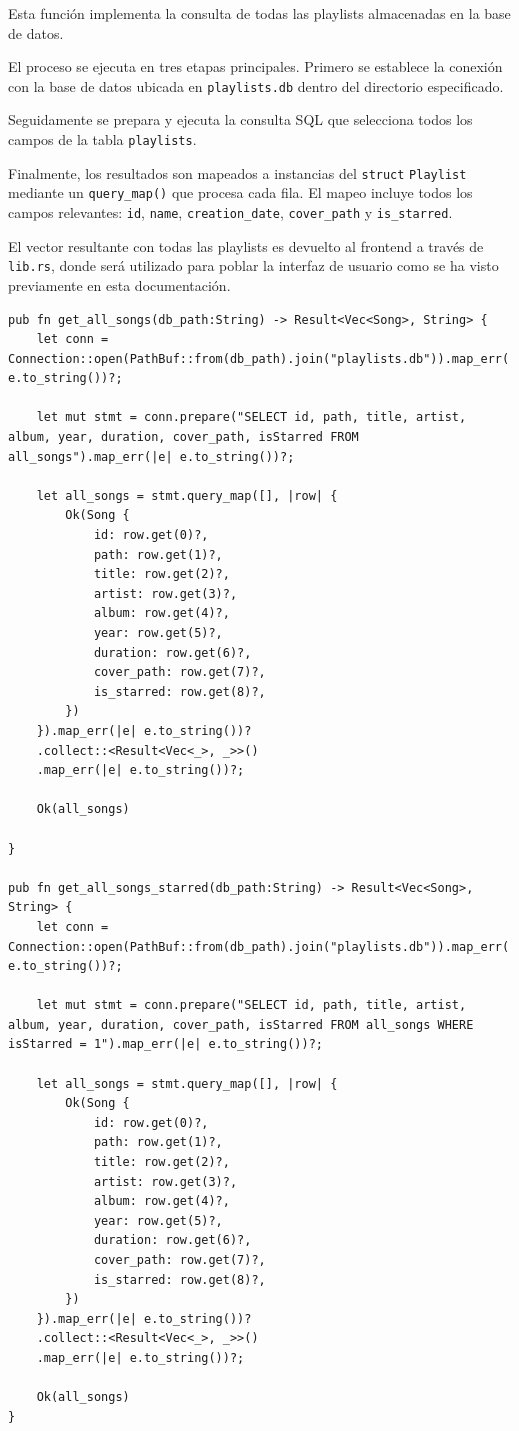 \documentclass[11pt, a4paper]{article}
\begin{document}
            Esta función implementa la consulta de todas las playlists almacenadas en la base de datos.

            El proceso se ejecuta en tres etapas principales. Primero se establece la conexión con la base de datos ubicada en \verb|playlists.db| dentro del directorio especificado.

            Seguidamente se prepara y ejecuta la consulta SQL que selecciona todos los campos de la tabla \verb|playlists|.

            Finalmente, los resultados son mapeados a instancias del \verb|struct| \verb|Playlist| mediante un \verb|query_map()| que procesa cada fila. El mapeo incluye todos los campos relevantes: \verb|id|, \verb|name|, \verb|creation_date|, \verb|cover_path| y \verb|is_starred|.

            El vector resultante con todas las playlists es devuelto al frontend a través de \verb|lib.rs|, donde será utilizado para poblar la interfaz de usuario como se ha visto previamente en esta documentación.

            \begin{lstlisting}[caption={fn get\_all\_songs() y fn get\_all\_songs\_starred()}]
pub fn get_all_songs(db_path:String) -> Result<Vec<Song>, String> {
    let conn = Connection::open(PathBuf::from(db_path).join("playlists.db")).map_err(|e| e.to_string())?;

    let mut stmt = conn.prepare("SELECT id, path, title, artist, album, year, duration, cover_path, isStarred FROM all_songs").map_err(|e| e.to_string())?;

    let all_songs = stmt.query_map([], |row| {
        Ok(Song {
            id: row.get(0)?,
            path: row.get(1)?,
            title: row.get(2)?,
            artist: row.get(3)?,
            album: row.get(4)?,
            year: row.get(5)?,
            duration: row.get(6)?,
            cover_path: row.get(7)?,
            is_starred: row.get(8)?,
        })
    }).map_err(|e| e.to_string())?
    .collect::<Result<Vec<_>, _>>()
    .map_err(|e| e.to_string())?;

    Ok(all_songs)

}

pub fn get_all_songs_starred(db_path:String) -> Result<Vec<Song>, String> {
    let conn = Connection::open(PathBuf::from(db_path).join("playlists.db")).map_err(|e| e.to_string())?;

    let mut stmt = conn.prepare("SELECT id, path, title, artist, album, year, duration, cover_path, isStarred FROM all_songs WHERE isStarred = 1").map_err(|e| e.to_string())?;

    let all_songs = stmt.query_map([], |row| {
        Ok(Song {
            id: row.get(0)?,
            path: row.get(1)?,
            title: row.get(2)?,
            artist: row.get(3)?,
            album: row.get(4)?,
            year: row.get(5)?,
            duration: row.get(6)?,
            cover_path: row.get(7)?,
            is_starred: row.get(8)?,
        })
    }).map_err(|e| e.to_string())?
    .collect::<Result<Vec<_>, _>>()
    .map_err(|e| e.to_string())?;

    Ok(all_songs)
}
            \end{lstlisting}
\end{document}
